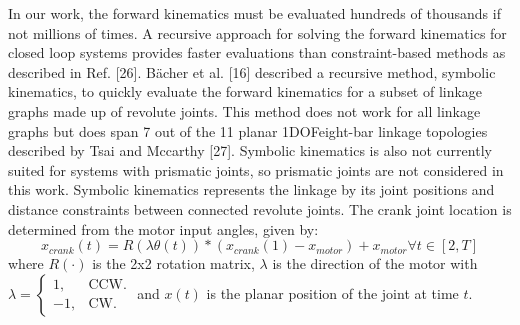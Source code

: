 In our work, the forward kinematics must be evaluated hundreds of thousands if not millions of times. A recursive approach for solving the forward kinematics for closed loop systems provides faster evaluations than constraint-based methods as described in Ref. [26]. Bächer et al. [16] described a recursive method, symbolic kinematics, to quickly evaluate the forward kinematics for a subset of linkage graphs made up of revolute joints. This method does not work for all linkage graphs but does span 7 out of the 11 planar 1DOFeight-bar linkage topologies described by Tsai and Mccarthy [27]. Symbolic kinematics is also not currently suited for systems with prismatic joints, so prismatic joints are not considered in this work. Symbolic kinematics represents the linkage by its joint positions and distance constraints between connected revolute joints. The crank joint location is determined from the motor input angles, given by:
\begin{equation}
    x_{crank}(t)=R(\lambda\theta(t))*(x_{crank}(1)-x_{motor})+x_{motor} \forall t\in[2,T]
\end{equation}
where $R(\cdot)$ is the 2x2 rotation matrix, $\lambda$ is the direction of the motor with $\lambda = \begin{cases}
    1, & \text{CCW}.\\
    -1, & \text{CW}.
  \end{cases}$ and $x(t)$ is the planar position of the joint at time $t$.


